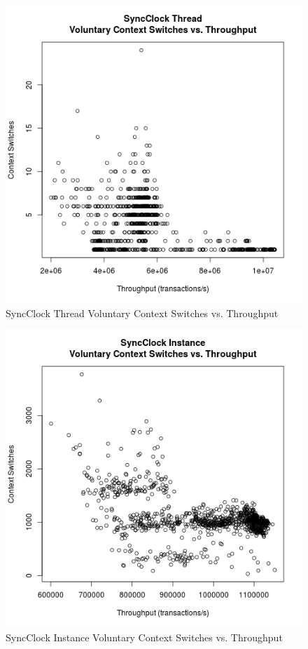 \begin{figure}[H]
\center
\includegraphics[height=.4\textheight]{sync_thread_throughput_context.png}
\caption{SyncClock Thread Voluntary Context Switches vs. Throughput}
\label{sync_thread_throughput_context}
\end{figure}

\begin{figure}[H]
\center
\includegraphics[height=.4\textheight]{sync_instance_throughput_context.png}
\caption{SyncClock Instance Voluntary Context Switches vs. Throughput}
\label{sync_instance_throughput_context}
\end{figure}

